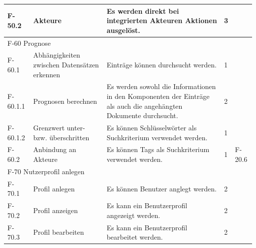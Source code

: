 \begin{tabularx}{\textwidth}{|l|X|X|l|l|}
	F-50.2 & Akteure & Es werden direkt bei integrierten Akteuren Aktionen ausgelöst. & 3 & \\
	\hline
	\multicolumn{5}{|l|}{F-60 Prognose}\\
	\hline
	F-60.1 & Abhängigkeiten zwischen Datensätzen erkennen & Einträge können durchsucht werden. & 1 &\\
	F-60.1.1 & Prognosen berechnen & Es werden sowohl die Informationen in den Komponenten der Einträge als auch die angehängten Dokumente durchsucht. & 2 & \\
	F-60.1.2 & Grenzwert unter- bzw. überschritten & Es können Schlüsselwörter als Suchkriterium verwendet werden. & 1 &\\
	F-60.2 & Anbindung an Akteure & Es können Tags als Suchkriterium verwendet werden. & 1 & F-20.6\\
	\hline
	\multicolumn{5}{|l|}{F-70 Nutzerprofil anlegen}\\
	\hline
	F-70.1 & Profil anlegen & Es können Benutzer anglegt werden. & 2 & \\
	F-70.2 & Profil anzeigen & Es kann ein Benutzerprofil angezeigt werden. & 2 & \\
	F-70.3 & Profil bearbeiten & Es kann ein Benutzerprofil bearbeitet werden. & 2 & \\
	\bottomrule
	
\end{tabularx}

